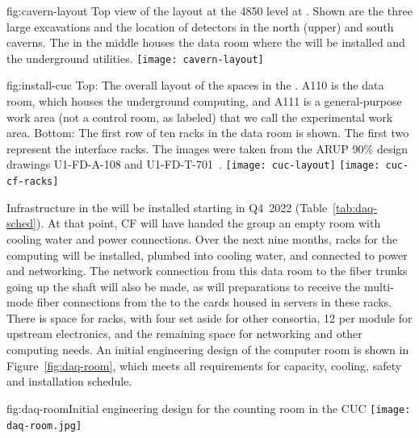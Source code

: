 \begin{dunefigure}{fig:cavern-layout}
  {Top view of the layout at the 4850 level at . Shown are the three large excavations and the location of detectors in the north (upper) and south caverns. 
  The  in the middle houses the  data room where the  will be installed and the underground utilities. }
\texttt{[image: cavern-layout]}
\end{dunefigure}

\begin{dunefigure}{fig:install-cuc}
  {Top: The overall layout of the  spaces in the . A110 is the  data room, which houses the underground computing, and A111 is a general-purpose work area (not a control room, as labeled) that we call the experimental work area. Bottom: The first row of ten racks in the data room is shown. The first two represent the  interface racks. The images were taken from the ARUP 90\% design drawings U1-FD-A-108 and U1-FD-T-701~\cite{bib:docdb14242}.}
\texttt{[image: cuc-layout]}
\vspace{-2pt}
\texttt{[image: cuc-cf-racks]}
\end{dunefigure}

Infrastructure in the  will be installed starting in Q4~2022
(Table~\ref{tab:daq-sched}).  At that point, CF will have
handed the  group an empty room with cooling water and power
connections.  Over the next nine months, racks for the  computing
will be installed, plumbed into cooling water, and connected to power
and networking.  The network connection from this data room to the fiber
trunks going up the shaft will also be made, as will preparations to
receive the multi-mode fiber connections from the  to the
 cards housed in servers in these racks. There is space
for \cucracks racks, with four set aside for other consortia, 12 per
module for upstream  electronics, and the remaining space for
networking and other  computing needs. An initial engineering design of the computer room is shown in Figure~\ref{fig:daq-room}, which meets all requirements for capacity, cooling, safety and installation schedule.

\begin{dunefigure}{fig:daq-room}{Initial engineering design for the  counting room in the CUC}
 \texttt{[image: daq-room.jpg]}
\end{dunefigure}

